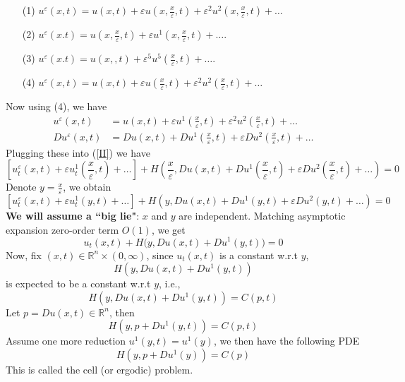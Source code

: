 \documentclass[12pt, oneside]{amsart}  	%
\begin{document}
\begin{itemize}
\item[(1)] $u^\varepsilon(x,t) = u(x,t)+\varepsilon u\left(x,\frac{x}{\varepsilon},t\right) + \varepsilon^2 u^2\left(x,\frac{x}{\varepsilon},t\right) + \ldots$ \vspace*{0.5cm}
\item[(2)] $u^\varepsilon(x.t) = u\left(x,\frac{x}{\varepsilon},t\right) + \varepsilon u^1\left(x,\frac{x}{\varepsilon},t\right) + \ldots$.
\vspace*{0.5cm}
\item[(3)] $u^\varepsilon(x.t) = u\left(x,,t\right) + \varepsilon^5 u^5\left(\frac{x}{\varepsilon},t\right) + \ldots$. 
\vspace*{0.5cm}
\item[(4)] $u^\varepsilon(x,t) = u(x,t)+\varepsilon u\left(\frac{x}{\varepsilon},t\right) + \varepsilon^2 u^2\left(\frac{x}{\varepsilon},t\right) + \ldots$
\end{itemize}
Now using (4), we have
\begin{align*}
u^\varepsilon(x,t) &= u(x,t)+\varepsilon u^1\left(\frac{x}{\varepsilon},t\right) + \varepsilon^2 u^2\left(\frac{x}{\varepsilon},t\right) + \ldots \\
Du^\varepsilon(x,t) &= Du(x,t)+Du^1\left(\frac{x}{\varepsilon},t\right) + \varepsilon Du^2\left(\frac{x}{\varepsilon},t\right) + \ldots
\end{align*}
Plugging these into (\ref{II}) we have 
\begin{equation*}
\left[u_t^\varepsilon(x,t) + \varepsilon u^1_t\left(\frac{x}{\varepsilon},t\right) + \ldots \right] + H\left( \frac{x}{\varepsilon}, Du(x,t)+Du^1\left(\frac{x}{\varepsilon},t\right) + \varepsilon Du^2\left(\frac{x}{\varepsilon},t\right) + \ldots\right)=0
\end{equation*}
Denote $y = \frac{x}{\varepsilon}$, we obtain
\begin{equation*}
\left[u_t^\varepsilon(x,t) + \varepsilon u^1_t\left(y,t\right) + \ldots \right] + H\left( y, Du(x,t)+Du^1\left(y,t\right) + \varepsilon Du^2\left(y,t\right) + \ldots\right)=0
\end{equation*}
{ \textbf{We will assume a ``big lie"}:} $x$ and $y$ are independent. Matching asymptotic expansion zero-order term $O(1)$, we get
\begin{equation*}
u_t(x,t) + H\Big(y,Du(x,t) + Du^1(y,t)\Big) = 0
\end{equation*}
Now, fix $(x,t)\in \mathbb{R}^n\times(0,\infty)$, since $u_t(x,t)$ is a constant w.r.t $y$, 
$$H(y,Du(x,t) + Du^1(y,t))$$
is expected to be a constant w.r.t $y$, i.e.,
\begin{equation*}
H(y,Du(x,t)+ Du^1(y,t)) = C(p,t)
\end{equation*}
Let $p= Du(x,t) \in \mathbb{R}^n$, then
\begin{equation*}
H(y,p+Du^1(y,t)) = C(p,t)
\end{equation*}
Assume one more reduction $u^1(y,t) = u^1(y)$, we then have the following PDE
\begin{equation*}
H(y, p+Du^1(y)) = C(p)
\end{equation*}
This is called the cell (or ergodic) problem.
\end{document}
